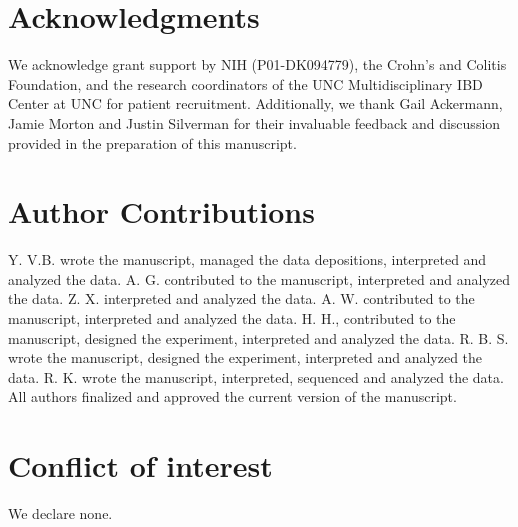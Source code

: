 \section{Acknowledgments}
We acknowledge grant support by NIH (P01-DK094779), the Crohn's and Colitis Foundation, and the research coordinators of the UNC Multidisciplinary IBD Center at UNC for patient recruitment. Additionally, we thank Gail Ackermann, Jamie Morton and Justin Silverman for their invaluable feedback and discussion provided in the preparation of this manuscript.

\section{Author Contributions}

Y. V.B. wrote the manuscript, managed the data depositions, interpreted and analyzed the data. A. G. contributed to the manuscript, interpreted and analyzed the data. Z. X. interpreted and analyzed the data. A. W. contributed to the manuscript, interpreted and analyzed the data. H. H., contributed to the manuscript, designed the experiment, interpreted and analyzed the data. R. B. S. wrote the manuscript, designed the experiment, interpreted and analyzed the data. R. K. wrote the manuscript, interpreted, sequenced and analyzed the data. All authors finalized and approved the current version of the manuscript.

\section{Conflict of interest}
We declare none.

